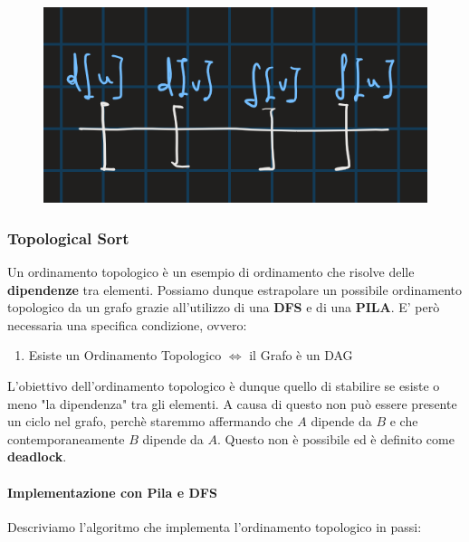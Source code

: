\documentclass{article}
\begin{document}
\begin{enumerate}
    \begin{figure}[htbp]
        \center
        \includegraphics[scale=0.35]{img/parenthesis2.png}
    \end{figure}
    
\end{enumerate}

\newpage

\subsubsection{Topological Sort}

Un ordinamento topologico è un esempio di ordinamento che risolve delle \textbf{dipendenze} tra elementi. Possiamo dunque estrapolare un possibile ordinamento topologico da un grafo grazie all'utilizzo di una \textbf{DFS} e di una \textbf{PILA}. E' però necessaria una specifica condizione, ovvero:

\begin{enumerate}
    \item Esiste un Ordinamento Topologico $\Leftrightarrow$ il Grafo è un DAG
\end{enumerate}

L'obiettivo dell'ordinamento topologico è dunque quello di stabilire se esiste o meno "la dipendenza" tra gli elementi. A causa di questo non può essere presente un ciclo nel grafo, perchè staremmo affermando che $A$ dipende da $B$ e che contemporaneamente $B$ dipende da $A$. Questo non è possibile ed è definito come \textbf{deadlock}.

\paragraph{Implementazione con Pila e DFS}

Descriviamo l'algoritmo che implementa l'ordinamento topologico in passi:
\end{document}
